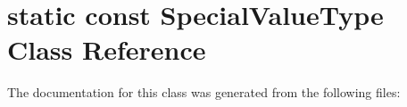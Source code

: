 \hypertarget{classstatic_01const_01SpecialValueType}{}\section{static const Special\+Value\+Type Class Reference}
\label{classstatic_01const_01SpecialValueType}


The documentation for this class was generated from the following files\+: